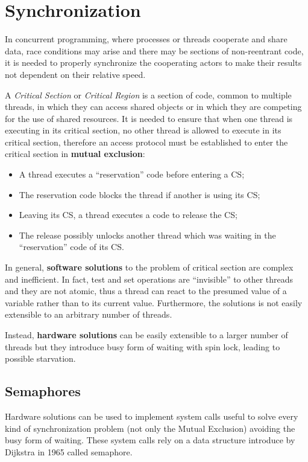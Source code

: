 \chapter{Synchronization}
In concurrent programming, where processes or threads cooperate and share data, race conditions may arise and there may be sections of non-reentrant code, it is needed to properly synchronize the cooperating actors to make their results not dependent on their relative speed.

A \emph{Critical Section} or \emph{Critical Region} is a section of code, common to multiple threads, in which they can access shared objects or in which they are competing for the use of shared resources. It is needed to ensure that when one thread is executing in its critical section, no other thread is allowed to execute in its critical section, therefore an access protocol must be established to enter the critical section in \textbf{mutual exclusion}:

\begin{itemize}
\item A thread executes a ``reservation'' code before entering a CS;
\item The reservation code blocks the thread if another is using its CS;
\item Leaving its CS, a thread executes a code to release the CS;
\item The release possibly unlocks another thread which was waiting in the ``reservation'' code of its CS.
\end{itemize}

In general, \textbf{software solutions} to the problem of critical section are complex and inefficient. In fact, test and set operations are ``invisible'' to other threads and they are not atomic, thus a thread can react to the presumed value of a variable rather than to its current value. Furthermore, the solutions is not easily extensible to an arbitrary number of threads.

Instead, \textbf{hardware solutions} can be easily extensible to a larger number of threads but they introduce busy form of waiting with spin lock, leading to possible starvation.

\section{Semaphores}
Hardware solutions can be used to implement system calls useful to solve every kind of synchronization problem (not only the Mutual Exclusion) avoiding the busy form of waiting. These system calls rely on a data structure introduce by Dijkstra in 1965 called semaphore.

